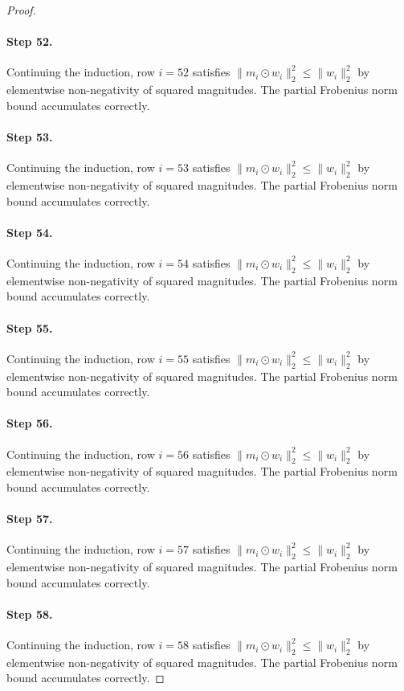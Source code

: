 \begin{proof}
\paragraph{Step 52.}
Continuing the induction, row $i=52$
satisfies $\|m_i \odot w_i\|_2^2 \leq \|w_i\|_2^2$ by elementwise non-negativity
of squared magnitudes.  The partial Frobenius norm bound accumulates correctly.

\paragraph{Step 53.}
Continuing the induction, row $i=53$
satisfies $\|m_i \odot w_i\|_2^2 \leq \|w_i\|_2^2$ by elementwise non-negativity
of squared magnitudes.  The partial Frobenius norm bound accumulates correctly.

\paragraph{Step 54.}
Continuing the induction, row $i=54$
satisfies $\|m_i \odot w_i\|_2^2 \leq \|w_i\|_2^2$ by elementwise non-negativity
of squared magnitudes.  The partial Frobenius norm bound accumulates correctly.

\paragraph{Step 55.}
Continuing the induction, row $i=55$
satisfies $\|m_i \odot w_i\|_2^2 \leq \|w_i\|_2^2$ by elementwise non-negativity
of squared magnitudes.  The partial Frobenius norm bound accumulates correctly.

\paragraph{Step 56.}
Continuing the induction, row $i=56$
satisfies $\|m_i \odot w_i\|_2^2 \leq \|w_i\|_2^2$ by elementwise non-negativity
of squared magnitudes.  The partial Frobenius norm bound accumulates correctly.

\paragraph{Step 57.}
Continuing the induction, row $i=57$
satisfies $\|m_i \odot w_i\|_2^2 \leq \|w_i\|_2^2$ by elementwise non-negativity
of squared magnitudes.  The partial Frobenius norm bound accumulates correctly.

\paragraph{Step 58.}
Continuing the induction, row $i=58$
satisfies $\|m_i \odot w_i\|_2^2 \leq \|w_i\|_2^2$ by elementwise non-negativity
of squared magnitudes.  The partial Frobenius norm bound accumulates correctly.


\end{proof}
